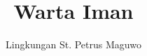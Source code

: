 \documentclass[a5paper,titlepage,11pt,openany]{scrbook}
\author{Lingkungan St. Petrus Maguwo}
\title{Warta Iman}
\begin{document}
\thispagestyle{empty}

\setlength{\parindent}{1cm}
\pagestyle{plain}
\begin{center}
\end{center}







%
\newpage


\end{document}
